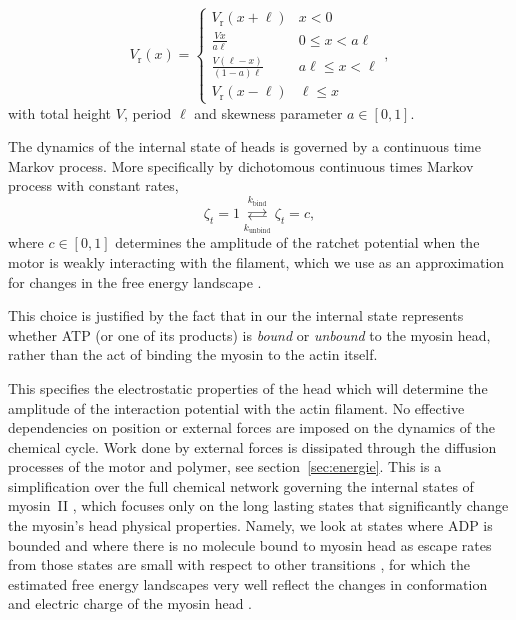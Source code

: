 \documentclass[aps,pre,twocolumn,showpacs,showkeys,superscriptaddress,floatfix]{revtex4-1}
\begin{document}
\begin{equation}
V_\text{r}(x) =  \begin{cases}
        V_\text{r}(x+\ell) & x < 0 \\[1ex] 
        \displaystyle \frac{ V x }{ a \ell } & 0 \leq x < a \ell \\[2ex]
        \displaystyle \frac{ V (\ell-x) }{ (1-a) \ell } & a \ell \leq x < \ell \\[2ex]
        V_\text{r}(x-\ell) & \ell \leq x  
   \end{cases} ,
   \label{eq:ratchet_potential}
\end{equation}
with total height $V$,
period $\ell$ 
and skewness parameter $a \in [0,1]$. 

The dynamics of the internal state of heads is governed by a continuous time Markov process. 
More specifically by dichotomous continuous times Markov process with constant rates,
\begin{equation}
\zeta_t = 1 \overset{k_\text{bind}}{\underset{k_\text{unbind}}{\rightleftarrows}} \zeta_t = c ,
\label{eq:transition}
\end{equation}
where $c\in\left[0,1\right]$ determines the amplitude of the ratchet potential when the motor is weakly interacting with the filament, 
which we use as an approximation for changes in the free energy landscape \cite{Nie2014,nie2014conformational}.

This choice is justified by the fact that in our the internal state represents whether ATP (or one of its products) is \emph{bound} or \emph{unbound} to the myosin head,
rather than the act of binding the myosin to the actin itself.

This specifies the electrostatic properties of the head which will determine the amplitude of the interaction potential with the actin filament.
No effective dependencies on position or external forces are imposed on the dynamics of the chemical cycle. 
Work done by external forces is dissipated through the diffusion processes of the motor and polymer, see section~\ref{sec:energie}.
This is a simplification over the full chemical network governing the internal states of myosin~II \cite{Bierbaum2011,Bierbaum2013},  
which focuses only on the long lasting states that significantly change the myosin's head physical properties.
Namely, we look at states where ADP is bounded and where there is no molecule bound to myosin head as escape rates from those states are small with respect to other transitions \cite{Bierbaum2011},  
for which the estimated free energy landscapes \cite{Nie2014,nie2014conformational} very well reflect the changes in  conformation and electric charge of the myosin head \cite{barterls1993myosin}.
\end{document}
